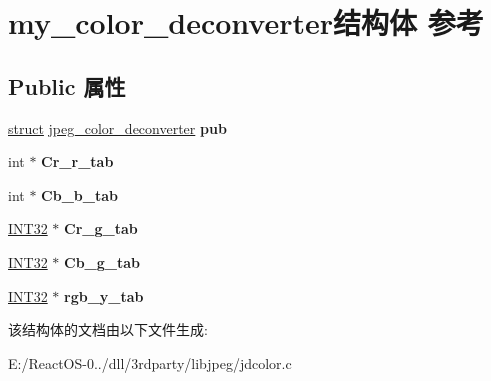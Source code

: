 \hypertarget{structmy__color__deconverter}{}\section{my\+\_\+color\+\_\+deconverter结构体 参考}
\label{structmy__color__deconverter}
\subsection*{Public 属性}
\begin{DoxyCompactItemize}
\item 
\mbox{\label{structmy__color__deconverter_a54bf241de985ca2e06da2bbee14e745a}} 
\hyperlink{interfacestruct}{struct} \hyperlink{structjpeg__color__deconverter}{jpeg\+\_\+color\+\_\+deconverter} {\bfseries pub}
\item 
\mbox{\label{structmy__color__deconverter_a25c4ee8d1066262c23a8181758eb0231}} 
int $\ast$ {\bfseries Cr\+\_\+r\+\_\+tab}
\item 
\mbox{\label{structmy__color__deconverter_aa40b60773afd04e0b076f83ed00069c9}} 
int $\ast$ {\bfseries Cb\+\_\+b\+\_\+tab}
\item 
\mbox{\label{structmy__color__deconverter_ab44aebbe0bd6d32aec678c71f7758bfc}} 
\hyperlink{_processor_bind_8h_a1137216524060afd426c34677fed058b}{I\+N\+T32} $\ast$ {\bfseries Cr\+\_\+g\+\_\+tab}
\item 
\mbox{\label{structmy__color__deconverter_abb16c33e195531366787333d6b7a2ef6}} 
\hyperlink{_processor_bind_8h_a1137216524060afd426c34677fed058b}{I\+N\+T32} $\ast$ {\bfseries Cb\+\_\+g\+\_\+tab}
\item 
\mbox{\label{structmy__color__deconverter_ad34e0f9d33aaf4b6329e65a95ec8130e}} 
\hyperlink{_processor_bind_8h_a1137216524060afd426c34677fed058b}{I\+N\+T32} $\ast$ {\bfseries rgb\+\_\+y\+\_\+tab}
\end{DoxyCompactItemize}


该结构体的文档由以下文件生成\+:\begin{DoxyCompactItemize}
\item 
E\+:/\+React\+O\+S-\/0../dll/3rdparty/libjpeg/jdcolor.\+c\end{DoxyCompactItemize}
